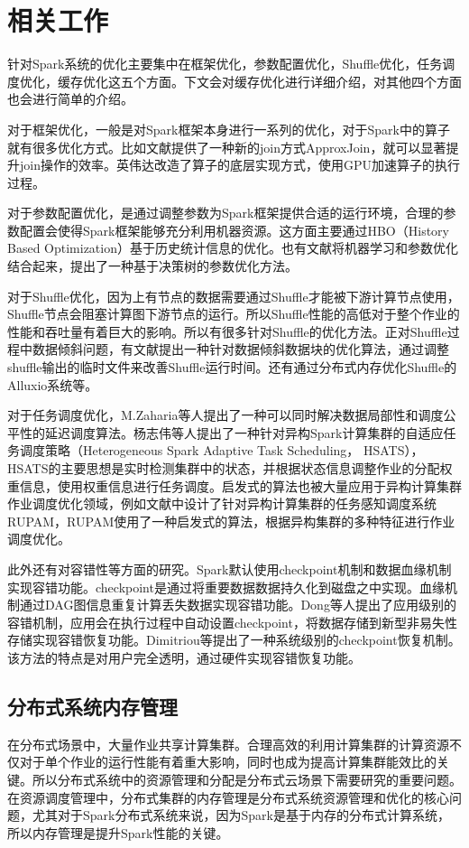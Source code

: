 \section{相关工作}
针对Spark系统的优化主要集中在框架优化，参数配置优化，Shuffle优化，任务调度优化，缓存优化这五个方面。下文会对缓存优化进行详细介绍，对其他四个方面也会进行简单的介绍。

对于框架优化，一般是对Spark框架本身进行一系列的优化，对于Spark中的算子就有很多优化方式。比如文献提供了一种新的join方式ApproxJoin，就可以显著提升join操作的效率。英伟达改造了算子的底层实现方式，使用GPU加速算子的执行过程。

对于参数配置优化，是通过调整参数为Spark框架提供合适的运行环境，合理的参数配置会使得Spark框架能够充分利用机器资源。这方面主要通过HBO（History Based Optimization）基于历史统计信息的优化。也有文献将机器学习和参数优化结合起来，提出了一种基于决策树的参数优化方法。

对于Shuffle优化，因为上有节点的数据需要通过Shuffle才能被下游计算节点使用，Shuffle节点会阻塞计算图下游节点的运行。所以Shuffle性能的高低对于整个作业的性能和吞吐量有着巨大的影响。所以有很多针对Shuffle的优化方法。正对Shuffle过程中数据倾斜问题，有文献提出一种针对数据倾斜数据块的优化算法，通过调整shuffle输出的临时文件来改善Shuffle运行时间。还有通过分布式内存优化Shuffle的Alluxio系统等。

对于任务调度优化，M.Zaharia等人提出了一种可以同时解决数据局部性和调度公平性的延迟调度算法。杨志伟等人提出了一种针对异构Spark计算集群的自适应任务调度策略（Heterogeneous Spark Adaptive Task Scheduling， HSATS），HSATS的主要思想是实时检测集群中的状态，并根据状态信息调整作业的分配权重信息，使用权重信息进行任务调度。启发式的算法也被大量应用于异构计算集群作业调度优化领域，例如文献中设计了针对异构计算集群的任务感知调度系统RUPAM，RUPAM使用了一种启发式的算法，根据异构集群的多种特征进行作业调度优化。

此外还有对容错性等方面的研究。Spark默认使用checkpoint机制和数据血缘机制实现容错功能。checkpoint是通过将重要数据数据持久化到磁盘之中实现。血缘机制通过DAG图信息重复计算丢失数据实现容错功能。Dong等人提出了应用级别的容错机制，应用会在执行过程中自动设置checkpoint，将数据存储到新型非易失性存储实现容错恢复功能。Dimitriou等提出了一种系统级别的checkpoint恢复机制。该方法的特点是对用户完全透明，通过硬件实现容错恢复功能。

\subsection{分布式系统内存管理}

在分布式场景中，大量作业共享计算集群。合理高效的利用计算集群的计算资源不仅对于单个作业的运行性能有着重大影响，同时也成为提高计算集群能效比的关键。所以分布式系统中的资源管理和分配是分布式云场景下需要研究的重要问题。在资源调度管理中，分布式集群的内存管理是分布式系统资源管理和优化的核心问题，尤其对于Spark分布式系统来说，因为Spark是基于内存的分布式计算系统，所以内存管理是提升Spark性能的关键。

